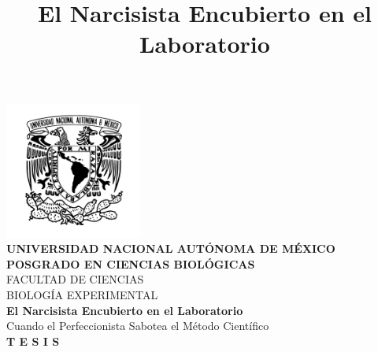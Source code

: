 \documentclass[
  10pt]{article}
\title{El Narcisista Encubierto en el Laboratorio}
\begin{document}

\pagestyle{plain} %

\begin{titlepage}
    \begin{center}
        \vspace*{-0.5cm} %
        
        \includegraphics[width=4.5cm]{ figuras/unam.png }\\[0.5cm]
        
        {\large \textbf{UNIVERSIDAD NACIONAL AUTÓNOMA DE MÉXICO}}\\[0.4cm]
        
        {\large \textbf{\MakeUppercase{Posgrado en Ciencias
Biológicas}}}\\[1cm]
        
        {\large \MakeUppercase{Facultad de Ciencias}}\\[0.4cm]
        {\large \MakeUppercase{Biología Experimental}}\\[1.2cm]
        
        {\Large \textbf{El Narcisista Encubierto en el
Laboratorio}}\\[0.3cm]
        {\small  Cuando el Perfeccionista Sabotea el Método
Científico }\\[0.6cm]
        
        {\LARGE \textbf{T E S I S}}\\[1cm]
        

\end{center}
\end{titlepage}
\end{document}
